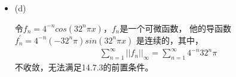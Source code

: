 \documentclass{article}
\begin{document}
\begin{itemize}
  \item (d)

        令$f_n = 4^{-n} cos(32^n \pi x)$，$f_n$是一个可微函数，
        他的导函数$f_n^\prime = 4^{-n} (-32^n \pi) sin(32^n \pi x)$
        是连续的，其中，
        \begin{align}
          \sum \limits_{n = 1}^{\infty} ||f_n||_{\infty} = \sum \limits_{n = 1}^{\infty} 4^{-n} 32^n \pi
        \end{align}
        不收敛，无法满足14.7.3的前置条件。

\end{itemize}
\end{document}
